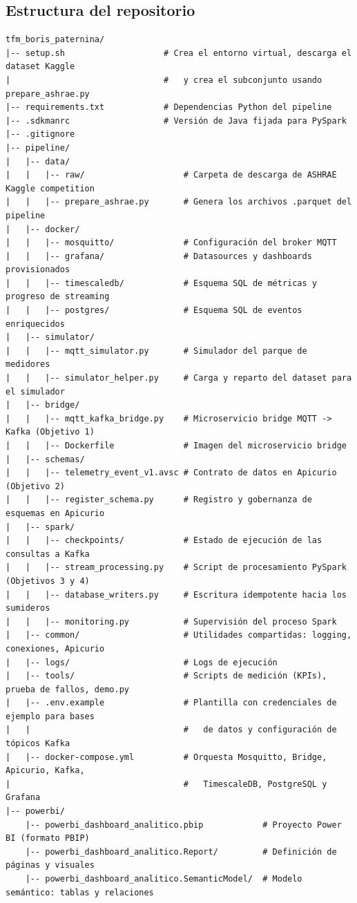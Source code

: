 \subsection{Estructura del repositorio}

{\footnotesize
\begin{verbatim}
tfm_boris_paternina/
|-- setup.sh                    # Crea el entorno virtual, descarga el dataset Kaggle
|                               #   y crea el subconjunto usando prepare_ashrae.py
|-- requirements.txt            # Dependencias Python del pipeline
|-- .sdkmanrc                   # Versión de Java fijada para PySpark
|-- .gitignore
|-- pipeline/
|   |-- data/
|   |   |-- raw/                    # Carpeta de descarga de ASHRAE Kaggle competition
|   |   |-- prepare_ashrae.py       # Genera los archivos .parquet del pipeline
|   |-- docker/
|   |   |-- mosquitto/              # Configuración del broker MQTT
|   |   |-- grafana/                # Datasources y dashboards provisionados
|   |   |-- timescaledb/            # Esquema SQL de métricas y progreso de streaming
|   |   |-- postgres/               # Esquema SQL de eventos enriquecidos
|   |-- simulator/
|   |   |-- mqtt_simulator.py       # Simulador del parque de medidores
|   |   |-- simulator_helper.py     # Carga y reparto del dataset para el simulador
|   |-- bridge/
|   |   |-- mqtt_kafka_bridge.py    # Microservicio bridge MQTT -> Kafka (Objetivo 1)
|   |   |-- Dockerfile              # Imagen del microservicio bridge
|   |-- schemas/
|   |   |-- telemetry_event_v1.avsc # Contrato de datos en Apicurio (Objetivo 2)
|   |   |-- register_schema.py      # Registro y gobernanza de esquemas en Apicurio
|   |-- spark/
|   |   |-- checkpoints/            # Estado de ejecución de las consultas a Kafka
|   |   |-- stream_processing.py    # Script de procesamiento PySpark (Objetivos 3 y 4)
|   |   |-- database_writers.py     # Escritura idempotente hacia los sumideros
|   |   |-- monitoring.py           # Supervisión del proceso Spark
|   |-- common/                     # Utilidades compartidas: logging, conexiones, Apicurio
|   |-- logs/                       # Logs de ejecución
|   |-- tools/                      # Scripts de medición (KPIs), prueba de fallos, demo.py
|   |-- .env.example                # Plantilla con credenciales de ejemplo para bases
|   |                               #   de datos y configuración de tópicos Kafka
|   |-- docker-compose.yml          # Orquesta Mosquitto, Bridge, Apicurio, Kafka, 
|                                   #   TimescaleDB, PostgreSQL y Grafana
|-- powerbi/
    |-- powerbi_dashboard_analitico.pbip            # Proyecto Power BI (formato PBIP)
    |-- powerbi_dashboard_analitico.Report/         # Definición de páginas y visuales
    |-- powerbi_dashboard_analitico.SemanticModel/  # Modelo semántico: tablas y relaciones
\end{verbatim}
}

